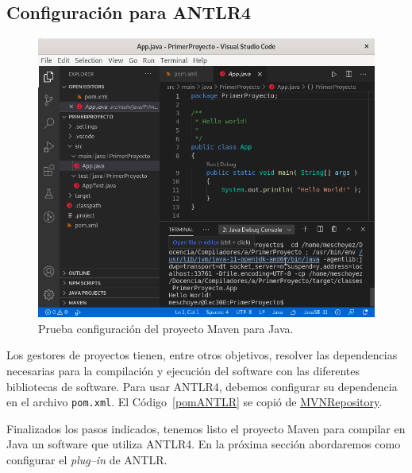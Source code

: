 \subsection{Configuración para ANTLR4}
\label{mavenANTLR}



\begin{figure}[t]
	\centering
	\includegraphics[width=.95\textwidth]{img/MavenTestEx}
	\caption{Prueba configuración del proyecto Maven para Java.}
	\label{mavenTestEx}
\end{figure}

Los gestores de proyectos tienen, entre otros objetivos, resolver las dependencias necesarias para la compilación y ejecución del software con las diferentes bibliotecas de software.  Para usar ANTLR4, debemos configurar su dependencia en el archivo \verb|pom.xml|.  El Código~\ref{pomANTLR} se copió de \href{https://mvnrepository.com/artifact/org.antlr/antlr4}{MVNRepository}.

Finalizados los pasos indicados, tenemos listo el proyecto Maven para compilar en Java un software que utiliza ANTLR4.  En la próxima sección abordaremos como configurar el \emph{plug--in} de ANTLR.
